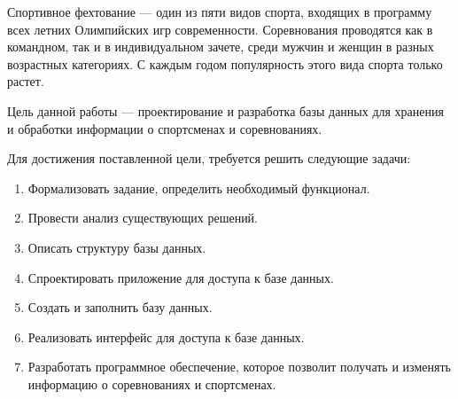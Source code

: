 \setcounter{page}{4}

Спортивное фехтование --- один из пяти видов спорта, входящих в программу всех летних Олимпийских игр современности.
Соревнования проводятся как в командном, так и в индивидуальном зачете, среди мужчин и женщин в разных возрастных категориях. С каждым годом популярность этого вида спорта только растет.

Цель данной работы --- проектирование и разработка базы данных для хранения и обработки информации о спортсменах и соревнованиях.

Для достижения поставленной цели, требуется решить следующие задачи:

\begin{enumerate}
	\item Формализовать задание, определить необходимый функционал.
	\item Провести анализ существующих решений.
	\item Описать структуру базы данных.
	\item Спроектировать приложение для доступа к базе данных.
	\item Создать и заполнить базу данных.
	\item Реализовать интерфейс для доступа к базе данных.
	\item Разработать программное обеспечение, которое позволит получать и изменять информацию о соревнованиях и спортсменах.
\end{enumerate}